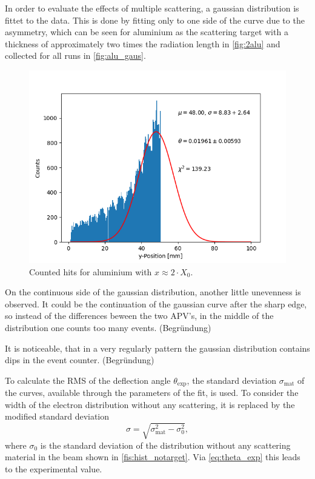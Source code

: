 \documentclass[sn-mathphys-num,iicol]{sn-jnl}
\theoremstyle{thmstyleone}
\theoremstyle{thmstyletwo}
\theoremstyle{thmstylethree}
\begin{document}
In order to evaluate the effects of multiple scattering, a gaussian distribution is fittet to the data. 
This is done by fitting only to one side of the curve due to the asymmetry, which can be seen for aluminium as the scattering target with a thickness of approximately two times the radiation length in \autoref{fig:2alu} and collected for all runs in \autoref{fig:alu_gaus}.

\begin{figure}
  \includegraphics[width=0.9\linewidth]{../src/elsa/finished_plots/Aluminium, Two Radiation Lengths, 40cm Distance.png}
  \caption{Counted hits for aluminium with $x\approx2\cdot X_0$.}
  \label{fig:2alu}
\end{figure}

On the continuous side of the gaussian distribution, another little unevenness is observed.
It could be the continuation of the gaussian curve after the sharp edge, so instead of the differences beween the two APV's, in the middle of the distribution one counts too many events. (Begründung)


It is noticeable, that in a very regularly pattern the gaussian distribution contains dips in the event counter. (Begründung)

To calculate the RMS of the deflection angle $\theta_\text{exp}$, the standard deviation $\sigma_\text{mat}$ of the curves, available through the parameters of the fit, is used. To consider the width of the electron distribution without any scattering, it is replaced by the modified standard deviation
\begin{equation} \label{eq:sigma_mod}
  \sigma = \sqrt{\sigma_\text{mat}^2 - \sigma_\text{0}^2},
\end{equation}
where $\sigma_\text{0}$ is the standard deviation of the distribution without any scattering material in the beam shown in \autoref{fis:hist_notarget}. 
Via \autoref{eq:theta_exp} this leads to the experimental value.
\end{document}
